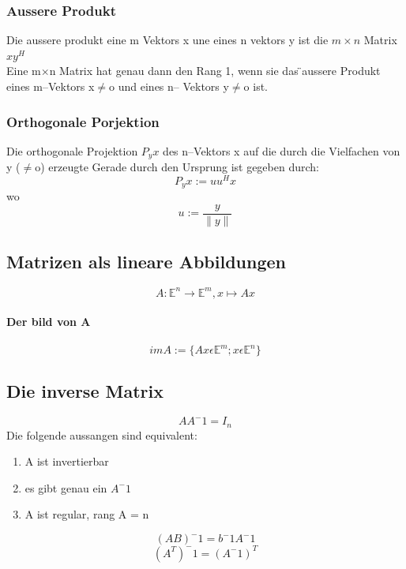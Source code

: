 \documentclass[11pt]{article}
\begin{document}
\subsubsection{Aussere Produkt}
Die aussere produkt eine m Vektors x une eines n vektors y ist die $m\times n$ Matrix $xy^H$\\Eine m$\times$n Matrix hat genau dann den Rang 1, wenn sie das  ̈aussere Produkt eines m–Vektors x$\neq$o und eines n– Vektors y$\neq$o ist.
\subsubsection{Orthogonale Porjektion}
Die orthogonale Projektion $P_yx$ des n–Vektors x auf die durch die Vielfachen von y ($\neq$o) erzeugte Gerade durch den Ursprung ist gegeben durch:
\begin{equation}
	P_yx := uu^Hx
\end{equation}
wo
\begin{equation}
	u := \frac{y}{\parallel y\parallel}
\end{equation}
\subsection{Matrizen als lineare Abbildungen}
\begin{equation}
	A: \mathbb{E}^n\rightarrow \mathbb{E}^m, x\mapsto Ax
\end{equation}
\paragraph{Der bild von A}
\begin{equation}
	im  A := \{Ax \epsilon \mathbb{E}^m; x \epsilon\mathbb{E}^n\}
\end{equation}
\subsection{Die inverse Matrix}
\begin{equation}
	AA^-1=I_n
\end{equation}
Die folgende aussangen sind equivalent:
\begin{enumerate}
	\item A ist invertierbar
	\item es gibt genau ein $A^-1$
	\item A ist regular, rang A = n
\end{enumerate}
\begin{equation}
	(AB)^-1 = b^-1A^-1
\end{equation}
\begin{equation}
	(A^T)^-1 = (A^-1)^T
\end{equation}
\end{document}
